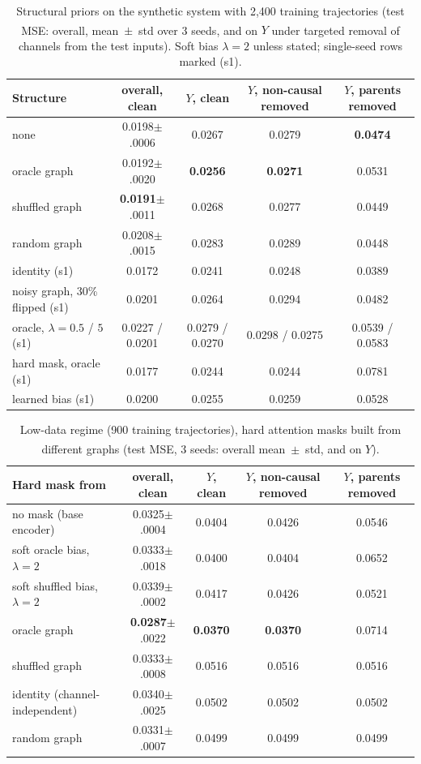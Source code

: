 \documentclass[sigconf,nonacm]{acmart}
\newcommand{\prelim}{\textsuperscript{\dag}}
\begin{document}
\begin{table}[t]
\caption{Structural priors on the synthetic system with 2{,}400 training trajectories (test MSE\prelim: overall,
mean~$\pm$~std over 3 seeds, and on $Y$ under targeted removal of channels from the test inputs). Soft bias
$\lambda=2$ unless stated; single-seed rows marked (s1).}
\label{tab:structure}
\small
\begin{tabular}{lcccc}
\toprule
Structure & overall, clean & $Y$, clean & $Y$, non-causal removed & $Y$, parents removed \\
\midrule
none & 0.0198$\pm$.0006 & 0.0267 & 0.0279 & \textbf{0.0474} \\
oracle graph & 0.0192$\pm$.0020 & \textbf{0.0256} & \textbf{0.0271} & 0.0531 \\
shuffled graph & \textbf{0.0191}$\pm$.0011 & 0.0268 & 0.0277 & 0.0449 \\
random graph & 0.0208$\pm$.0015 & 0.0283 & 0.0289 & 0.0448 \\
identity (s1) & 0.0172 & 0.0241 & 0.0248 & 0.0389 \\
noisy graph, 30\% flipped (s1) & 0.0201 & 0.0264 & 0.0294 & 0.0482 \\
oracle, $\lambda=0.5$ / $5$ (s1) & 0.0227 / 0.0201 & 0.0279 / 0.0270 & 0.0298 / 0.0275 & 0.0539 / 0.0583 \\
hard mask, oracle (s1) & 0.0177 & 0.0244 & 0.0244 & 0.0781 \\
learned bias (s1) & 0.0200 & 0.0255 & 0.0259 & 0.0528 \\
\bottomrule
\end{tabular}
\end{table}

\begin{table}[t]
\caption{Low-data regime (900 training trajectories), hard attention masks built from different graphs (test
MSE\prelim, 3 seeds: overall mean~$\pm$~std, and on $Y$).}
\label{tab:lowdata}
\small
\begin{tabular}{lcccc}
\toprule
Hard mask from & overall, clean & $Y$, clean & $Y$, non-causal removed & $Y$, parents removed \\
\midrule
no mask (base encoder) & 0.0325$\pm$.0004 & 0.0404 & 0.0426 & 0.0546 \\
soft oracle bias, $\lambda=2$ & 0.0333$\pm$.0018 & 0.0400 & 0.0404 & 0.0652 \\
soft shuffled bias, $\lambda=2$ & 0.0339$\pm$.0002 & 0.0417 & 0.0426 & 0.0521 \\
oracle graph & \textbf{0.0287}$\pm$.0022 & \textbf{0.0370} & \textbf{0.0370} & 0.0714 \\
shuffled graph & 0.0333$\pm$.0008 & 0.0516 & 0.0516 & 0.0516 \\
identity (channel-independent) & 0.0340$\pm$.0025 & 0.0502 & 0.0502 & 0.0502 \\
random graph & 0.0331$\pm$.0007 & 0.0499 & 0.0499 & 0.0499 \\
\bottomrule
\end{tabular}
\end{table}
\end{document}

